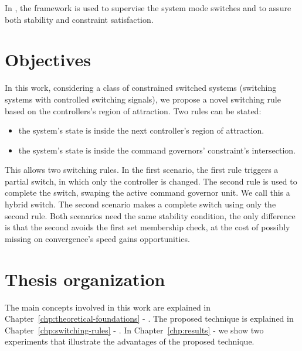In \parencite{franzè.lucia.ea:command,lucia.franzè:stabilization}, the \CG{}
framework is used to supervise the system mode switches and to assure both
stability and constraint satisfaction.

\section{Objectives}%
\label{sec:objectives}

In this work, considering a class of constrained switched systems (switching
systems with controlled switching signals), we propose a novel switching rule
based on the controllers's region of attraction. Two rules can be stated:

\begin{itemize}
  \item the system's state is inside the next controller's region of attraction.
  \item the system's state is inside the command governors' constraint's
        intersection.
\end{itemize}

This allows two switching rules. In the first scenario, the first rule triggers
a partial switch, in which only the controller is changed. The second rule is
used to complete the switch, swaping the active command governor unit. We call
this a hybrid switch. The second scenario makes a complete switch using only the
second rule. Both scenarios need the same stability condition, the only
difference is that the second avoids the first set membership check, at the cost
of possibly missing on convergence's speed gains opportunities.

\section{Thesis organization}%
\label{sec:organization}

The main concepts involved in this work are explained in
Chapter~\ref{chp:theoretical-foundations} -
. The proposed technique is explained in
Chapter~\ref{chp:switching-rules} - . In
Chapter~\ref{chp:results} -  we show two experiments that
illustrate the advantages of the proposed technique.
